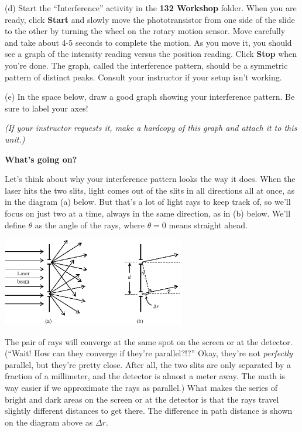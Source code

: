 (d) Start the ``Interference'' activity in the {\bf 132 Workshop} folder. 
When you are ready, click {\bf Start} and slowly move the phototransistor 
from one side of the slide to the other by turning the wheel on the rotary 
motion sensor. Move carefully and take about 4-5 seconds to complete the 
motion. 
As you move it, you should see a graph of the intensity reading versus the position reading. 
Click {\bf Stop} when you're done. 
The graph, called the interference pattern, should be a symmetric pattern of distinct peaks. Consult your instructor if your setup isn't working.

\pagebreak[2]
(e) In the space below, draw a good graph showing your interference pattern.  
Be sure to label your axes!
\answerspace{1.5in}

\textit{(If your instructor requests it, make a hardcopy of this graph and attach it to this unit.)}

\textbf{What's going on?}

Let's think about why your interference pattern looks the way it does.  When the laser hits the two slits, 
light comes out of the slits in all directions all at once, as in the diagram (a) below.  
But that's a lot of light rays to keep track of, so we'll focus on just two at a time, always in the same direction, as in (b) below.
We'll define $\theta$ as the angle of the rays, where $\theta=0$ means straight ahead.  

\vspace{-0.2in}
\begin{center}
\includegraphics[width=0.6\textwidth]{interference_and_diffraction/rays.eps}
\end{center}
\vspace{-0.2in}

The pair of rays will converge at the same spot on the screen or at the detector.  (``Wait!  How can they converge if they're parallel?!?''  Okay, they're not \textit{perfectly} parallel, but they're pretty close.  After all, the two slits are only separated by a fraction of a millimeter, and the detector is almost a meter away.  The math is way easier if we approximate the rays as parallel.)
What makes the series of bright and dark areas on the screen or at the detector is that the rays travel slightly different distances to get there.
The difference in path distance is shown on the diagram above as $\Delta r$.  

